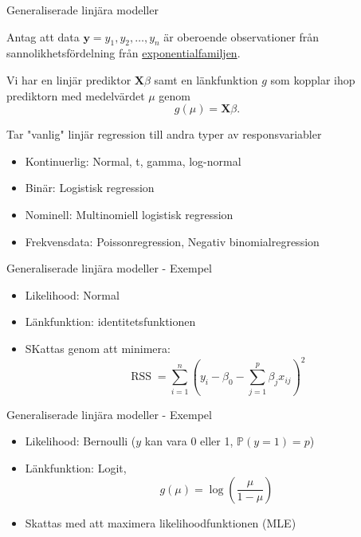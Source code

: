 \documentclass[10pt,english]{beamer}
\begin{document}
\begin{frame}{Generaliserade linjära modeller}

    Antag att data $\mathbf{y} = y_1, y_2, \ldots, y_n$ är oberoende observationer från sannolikhetsfördelning från \href{https://en.wikipedia.org/wiki/Exponential_family}{exponentialfamiljen}.

    Vi har en linjär prediktor $\mathbf{X} \beta$ samt en länkfunktion $g$ som kopplar ihop prediktorn med medelvärdet $\mu$ genom
    \begin{equation*}
        g(\mu) = \mathbf{X} \beta.
    \end{equation*}
    
    Tar "vanlig" linjär regression till andra typer av responsvariabler
    \begin{itemize}
        \item Kontinuerlig: Normal, t, gamma, log-normal
        \item Binär: Logistisk regression
        \item Nominell: Multinomiell logistisk regression
        \item Frekvensdata: Poissonregression, Negativ binomialregression
    \end{itemize}
\end{frame}

\begin{frame}{Generaliserade linjära modeller - Exempel}

    \begin{itemize}
        \item Likelihood: Normal
        \item L\"ankfunktion: identitetsfunktionen
        \item SKattas genom att minimera:
        \begin{equation*}
            \operatorname{RSS} = \sum_{i=1}^{n} \left( y_i - \beta_0 - \sum_{j=1}^{p} \beta_j x_{ij} \right)^2
        \end{equation*}
    \end{itemize}

\end{frame}

\begin{frame}{Generaliserade linjära modeller - Exempel}
    \begin{itemize}
        \item Likelihood: Bernoulli ($y$ kan vara 0 eller 1, $\mathbb{P}(y = 1) = p$)
        \item L\"ankfunktion: Logit,
        \begin{equation*}
            g(\mu) = \log\left( \frac{\mu}{1-\mu} \right)
        \end{equation*}
        \item Skattas med att maximera likelihoodfunktionen (MLE)
    \end{itemize}
\end{frame}
\end{document}
